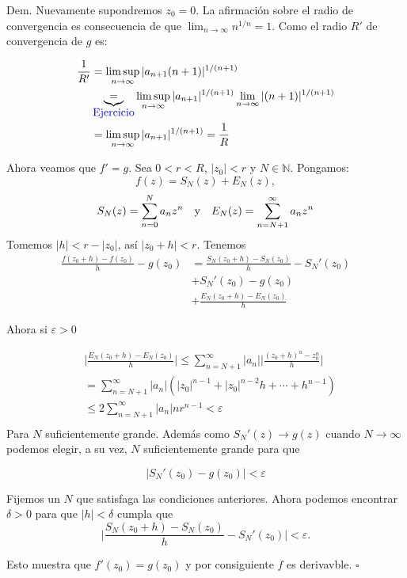 \documentclass{article}
\newenvironment{demo}{\noindent\emph{Dem.}}{{\hspace*{\fill}$\square$} \newline\vspace{5pt}}
\renewcommand{\emph}[1]{\textcolor[rgb]{0,0,1}{#1}}
\renewcommand{\epsilon}{\varepsilon}
\begin{document}
\begin{demo} Nuevamente supondremos $z_0=0$. La afirmación sobre el radio de convergencia es consecuencia de que $\lim_{n\to\infty}n^{1/n}=1$. Como el radio $R'$ de convergencia de $g$ es:

\[
\begin{split}
\frac{1}{R'}&=\limsup_{n\to\infty}|a_{n+1}(n+1)|^{1/(n+1)}\\
&\underbrace{=}_{\hbox{\emph{ Ejercicio}}}\limsup_{n\to\infty}|a_{n+1}|^{1/(n+1)}\lim_{n\to\infty}|(n+1)|^{1/(n+1)}\\
&=\limsup_{n\to\infty}|a_{n+1}|^{1/(n+1)}=\frac{1}{R}
\end{split}\]

Ahora veamos que  $f'=g$.   Sea $0<r<R$, $|z_0|<r$ y $N\in\mathbb{N}$. Pongamos:
\[f(z)=S_N(z)+E_N(z),\]
\[S_N(z)=\sum_{n=0}^{N}a_nz^n\quad\hbox{y}\quad E_N(z)=\sum_{n=N+1}^{\infty}a_nz^n\]
Tomemos $|h|<r-|z_0|$, así $|z_0+h|<r$.  Tenemos
\[\begin{split}
\frac{f(z_0+h)-f(z_0)}{h}-g(z_0)&= \frac{S_N(z_0+h)-S_N(z_0)}{h}-S_N'(z_0)\\
				&+S_N'(z_0)-g(z_0)\\
				&+\frac{E_N(z_0+h)-E_N(z_0)}{h}
\end{split}\]

Ahora si $\epsilon>0$

\[\begin{split}
				&\bigg|\frac{E_N(z_0+h)-E_N(z_0)}{h}\bigg|\leq\sum_{n=N+1}^{\infty}|a_n|\bigg|\frac{(z_0+h)^n-z_0^n}{h}\bigg|\\
				&=\sum_{n=N+1}^{\infty}|a_n|(|z_0|^{n-1}+|z_0|^{n-2}h+\cdots+h^{n-1})\\
				&\leq2\sum_{n=N+1}^{\infty}|a_n|nr^{n-1}<\epsilon\\
\end{split}\]
Para $N$ suficientemente grande. Además como $S_N'(z)\to g(z)$ cuando $N\to\infty$ podemos elegir, a su vez, $N$ suficientemente grande para que

\[
	|S_N'(z_0)-g(z_0)|<\epsilon
\]

 Fijemos un $N$ que satisfaga las condiciones anteriores. Ahora podemos encontrar $\delta>0$ para que $|h|<\delta$ cumpla que 
\[
\bigg|\frac{S_N(z_0+h)-S_N(z_0)}{h}-S_N'(z_0)\bigg|<\epsilon.
\]

Esto muestra que $f'(z_0)=g(z_0)$ y por consiguiente $f$ es derivavble.  
\end{demo}


 
\end{document}
